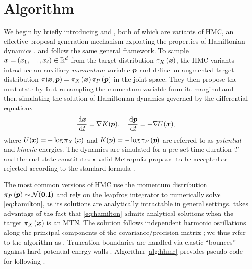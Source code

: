 \section{Algorithm}
\label{sec:algorithm}
We begin by briefly introducing \hhmc and \zhmc, both of which are variants of HMC, an effective proposal generation mechanism exploiting the properties of Hamiltonian dynamics \citep{hmcneal}.
\hhmc and \zhmc follow the same general framework.
To sample $ \bm{x} = \left(x_1, \dots, x_d\right) \in \mathbb{R}^{d}$ from the target distribution $ \pi_X\left(\bm{x}\right) $, the HMC variants introduce an auxiliary \textit{momentum} variable $ \bm{p}$ and define an augmented target distribution $\pi(\bm{x}, \bm{p}) = \pi_X\left(\bm{x}\right) \pi_P\left(\bm{p}\right)$ in the joint space.
They then propose the next state by first re-sampling the momentum variable from its marginal and then simulating the solution of Hamiltonian dynamics governed by the differential equations
\begin{equation}
\label{eq:hamilton}
\frac{\, {\rm d} \bm{x}}{\, {\rm d} t}
= \nabla K(\bm{p}), \quad
\frac{\, {\rm d} \bm{p}}{\, {\rm d} t}
= - \nabla U(\bm{x}),
\end{equation}
where $U(\bm{x})=- \log \pi_X\left(\bm{x}\right)$ and $K(\bm{p}) = - \log \pi_P\left(\bm{p}\right)$ are referred to as \textit{potential} and \textit{kinetic} energies.
The dynamics are simulated for a pre-set time duration $T$ and the end state constitutes a valid Metropolis proposal to be accepted or rejected according to the standard formula \citep{metropolis53, hastings1970monte}.

The most common versions of HMC use the momentum distribution $ \pi_P\left(\bm{p}\right) \sim \mathcal{N}(\bm{0}, \mathbf{I}) $ and rely on the leapfrog integrator to numerically solve \eqref{eq:hamilton}, as its solutions are analytically intractable in general settings. \hhmc takes advantage of the fact that \eqref{eq:hamilton} admits analytical solutions when the target $\pi_X\left(\bm{x}\right)$ is an MTN.
The solution follows independent harmonic oscillations along the principal components of the covariance/precision matrix \citep{pakman2014exact};
we thus refer to the algorithm as \hhmc. 
Truncation boundaries are handled via elastic ``bounces'' against hard potential energy walls \citep{hmcneal}.
Algorithm \ref{alg:hhmc} provides pseudo-code for \hhmc following  \protect\citet{pakman2014exact}.

